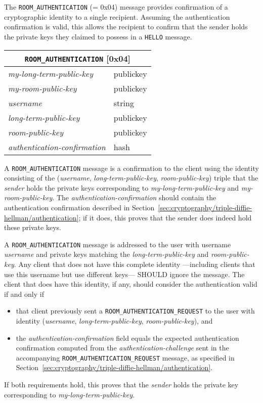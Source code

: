\documentclass{article}
\def\message#1{\texttt{#1}}
\def\field#1{\textit{#1}}
\def\type#1{\textsf{#1}}
\newenvironment{basicmessage}[2]{
\newcommand{\messagefield}[2]{
\field{##1} & \type{##2} \\
\hline
}
\hspace{2em minus 2em}\begin{tabular}{|l|l|}
\hline
\multicolumn{2}{|c|}{\message{#1} [#2]} \\
\hline
\hline
}{
\end{tabular}
}
\begin{document}
The \message{ROOM\_AUTHENTICATION} (= 0x04) message provides confirmation of a cryptographic identity to a single recipient.
Assuming the authentication confirmation is valid, this allows the recipient to confirm that the sender holds the private keys they claimed to possess in a \message{HELLO} message.

\begin{basicmessage}{ROOM\_AUTHENTICATION}{0x04}
\messagefield{my-long-term-public-key}{publickey}
\messagefield{my-room-public-key}{publickey}
\messagefield{username}{string}
\messagefield{long-term-public-key}{publickey}
\messagefield{room-public-key}{publickey}
\messagefield{authentication-confirmation}{hash}
\end{basicmessage}

A \message{ROOM\_AUTHENTICATION} message is a confirmation to the client using the identity consisting of the (\field{username}, \field{long-term-public-key}, \field{room-public-key}) triple that the \field{sender} holds the private keys corresponding to \field{my-long-term-public-key} and \field{my-room-public-key}.
The \emph{authentication-confirmation} should contain the authentication confirmation described in Section~\ref{sec:cryptography/triple-diffie-hellman/authentication}; if it does, this proves that the sender does indeed hold these private keys.

A \message{ROOM\_AUTHENTICATION} message is addressed to the user with username \field{username} and private keys matching the \field{long-term-public-key} and \field{room-public-key}.
Any client that does not have this complete identity ---including clients that use this username but use different keys--- SHOULD ignore the message.
The client that does have this identity, if any, should consider the authentication valid if and only if
\begin{itemize}
\item that client previously sent a \message{ROOM\_AUTHENTICATION\_REQUEST} to the user with identity (\field{username}, \field{long-term-public-key}, \field{room-public-key}), and
\item the \field{authentication-confirmation} field equals the expected authentication confirmation computed from the \field{authentication-challenge} sent in the accompanying \message{ROOM\_AUTHENTICATION\_REQUEST} message, as specified in Section~\ref{sec:cryptography/triple-diffie-hellman/authentication}.
\end{itemize}
If both requirements hold, this proves that the \field{sender} holds the private key corresponding to \field{my-long-term-public-key}.
\end{document}

